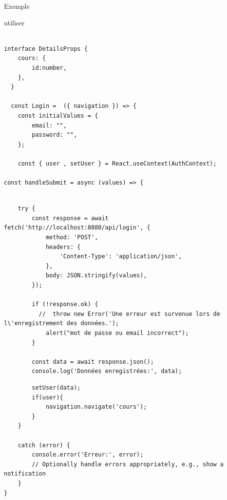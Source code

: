 \documentclass[5pt]{beamer}
\begin{document}
{\begin{frame}[fragile]{Exemple}
\begin{block}{utiliser}
\end{block}
\end{frame}

\begin{frame}[fragile]{}
\begin{block}{}
\begin{verbatim}

interface DetailsProps {
    cours: {
        id:number,
    },
  }

  const Login =  ({ navigation }) => {
    const initialValues = {
        email: "",
        password: "",
    };

    const { user , setUser } = React.useContext(AuthContext);
  
const handleSubmit = async (values) => { 
\end{verbatim}

\end{block}
\end{frame}

\begin{frame}[fragile]{}
\begin{block}{}
\begin{verbatim}
   
    try {
        const response = await fetch('http://localhost:8080/api/login', {
            method: 'POST',
            headers: {
                'Content-Type': 'application/json',
            },
            body: JSON.stringify(values),
        });

        if (!response.ok) {
          //  throw new Error('Une erreur est survenue lors de l\'enregistrement des données.');
            alert("mot de passe ou email incorrect");
        }

        const data = await response.json();
        console.log('Données enregistrées:', data);
        \end{verbatim}

\end{block}
\end{frame}

\begin{frame}[fragile]{}
\begin{block}{}
\begin{verbatim}
        setUser(data);
        if(user){
            navigation.navigate('cours');
        }
    }
    
    catch (error) {
        console.error('Erreur:', error);
        // Optionally handle errors appropriately, e.g., show a notification
    }
}


\end{verbatim}
\end{block}
\end{frame}}
\end{document}
